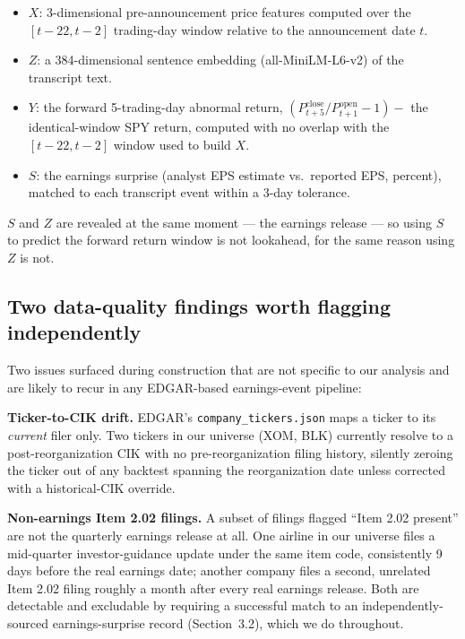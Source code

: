 \documentclass[11pt]{article}
\begin{document}
\begin{itemize}
  \item $X$: 3-dimensional pre-announcement price features computed over the $[t-22, t-2]$ trading-day window relative to the announcement date $t$.
  \item $Z$: a 384-dimensional sentence embedding (all-MiniLM-L6-v2) of the transcript text.
  \item $Y$: the forward 5-trading-day abnormal return, $(P_{t+5}^{\text{close}} / P_{t+1}^{\text{open}} - 1) - $ the identical-window SPY return, computed with no overlap with the $[t-22,t-2]$ window used to build $X$.
  \item $S$: the earnings surprise (analyst EPS estimate vs.\ reported EPS, percent), matched to each transcript event within a 3-day tolerance.
\end{itemize}

$S$ and $Z$ are revealed at the same moment --- the earnings release --- so using $S$ to predict the forward return window is not lookahead, for the same reason using $Z$ is not.

\subsection{Two data-quality findings worth flagging independently}

Two issues surfaced during construction that are not specific to our analysis and are likely to recur in any EDGAR-based earnings-event pipeline:

\textbf{Ticker-to-CIK drift.} EDGAR's \texttt{company\_tickers.json} maps a ticker to its \emph{current} filer only. Two tickers in our universe (XOM, BLK) currently resolve to a post-reorganization CIK with no pre-reorganization filing history, silently zeroing the ticker out of any backtest spanning the reorganization date unless corrected with a historical-CIK override.

\textbf{Non-earnings Item 2.02 filings.} A subset of filings flagged ``Item 2.02 present'' are not the quarterly earnings release at all. One airline in our universe files a mid-quarter investor-guidance update under the same item code, consistently 9 days before the real earnings date; another company files a second, unrelated Item 2.02 filing roughly a month after every real earnings release. Both are detectable and excludable by requiring a successful match to an independently-sourced earnings-surprise record (Section~3.2), which we do throughout.
\end{document}
